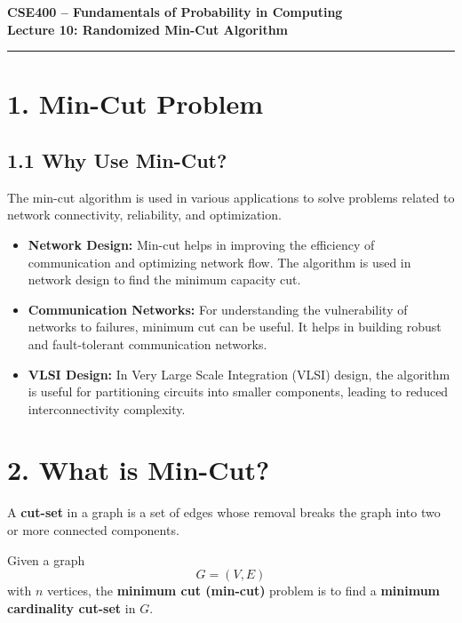 \documentclass[12pt]{article}
\begin{document}
\begin{center}
    \Large \textbf{CSE400 – Fundamentals of Probability in Computing} \\[0.5em]
    \large \textbf{Lecture 10: Randomized Min-Cut Algorithm}
\end{center}

\hrule
\vspace{1em}

\section*{1. Min-Cut Problem}

\subsection*{1.1 Why Use Min-Cut?}

The min-cut algorithm is used in various applications to solve problems related to network connectivity, reliability, and optimization.

\begin{itemize}
    \item \textbf{Network Design:}  
    Min-cut helps in improving the efficiency of communication and optimizing network flow. The algorithm is used in network design to find the minimum capacity cut.

    \item \textbf{Communication Networks:}  
    For understanding the vulnerability of networks to failures, minimum cut can be useful. It helps in building robust and fault-tolerant communication networks.

    \item \textbf{VLSI Design:}  
    In Very Large Scale Integration (VLSI) design, the algorithm is useful for partitioning circuits into smaller components, leading to reduced interconnectivity complexity.
\end{itemize}

\section*{2. What is Min-Cut?}

A \textbf{cut-set} in a graph is a set of edges whose removal breaks the graph into two or more connected components.

Given a graph
\[
G = (V, E)
\]
with \( n \) vertices, the \textbf{minimum cut (min-cut)} problem is to find a \textbf{minimum cardinality cut-set} in \( G \).
\end{document}
